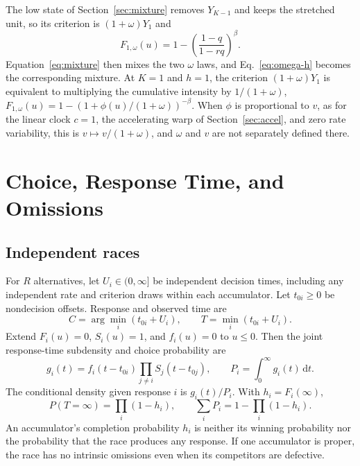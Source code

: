 \documentclass[12pt]{article}
\newcommand{\dd}{\,\mathrm{d}}
\theoremstyle{definition}
\theoremstyle{plain}
\theoremstyle{remark}
\begin{document}
The low state of Section~\ref{sec:mixture} removes $Y_{K-1}$ and keeps the stretched unit, so its criterion is $(1+\omega)Y_1$ and
\begin{equation}
 F_{1,\omega}(u)=1-\left(\frac{1-q}{1-rq}\right)^\beta.
\end{equation}
Equation~\eqref{eq:mixture} then mixes the two $\omega$ laws, and Eq.~\eqref{eq:omega-h} becomes the corresponding mixture. At $K=1$ and $h=1$, the criterion $(1+\omega)Y_1$ is equivalent to multiplying the cumulative intensity by $1/(1+\omega)$, $F_{1,\omega}(u)=1-(1+\phi(u)/(1+\omega))^{-\beta}$. When $\phi$ is proportional to $v$, as for the linear clock $c=1$, the accelerating warp of Section~\ref{sec:accel}, and zero rate variability, this is $v\mapsto v/(1+\omega)$, and $\omega$ and $v$ are not separately defined there.

\section{Choice, Response Time, and Omissions}\label{sec:race}

\subsection{Independent races}
For $R$ alternatives, let $U_i\in(0,\infty]$ be independent decision times, including any independent rate and criterion draws within each accumulator. Let $t_{0i}\geq0$ be nondecision offsets. Response and observed time are
\begin{equation}
 C=\arg\min_i(t_{0i}+U_i),\qquad T=\min_i(t_{0i}+U_i).
\end{equation}
Extend $F_i(u)=0$, $S_i(u)=1$, and $f_i(u)=0$ to $u\leq0$. Then the joint response-time subdensity and choice probability are
\begin{equation}
 g_i(t)=f_i(t-t_{0i})\prod_{j\ne i}S_j(t-t_{0j}),\qquad
 P_i=\int_0^\infty g_i(t)\dd t.\label{eq:race}
\end{equation}
The conditional density given response $i$ is $g_i(t)/P_i$. With $h_i=F_i(\infty)$,
\begin{equation}
 P(T=\infty)=\prod_i(1-h_i),\qquad
 \sum_i P_i=1-\prod_i(1-h_i).\label{eq:race-omissions}
\end{equation}
An accumulator's completion probability $h_i$ is neither its winning probability nor the probability that the race produces any response. If one accumulator is proper, the race has no intrinsic omissions even when its competitors are defective.
\end{document}
